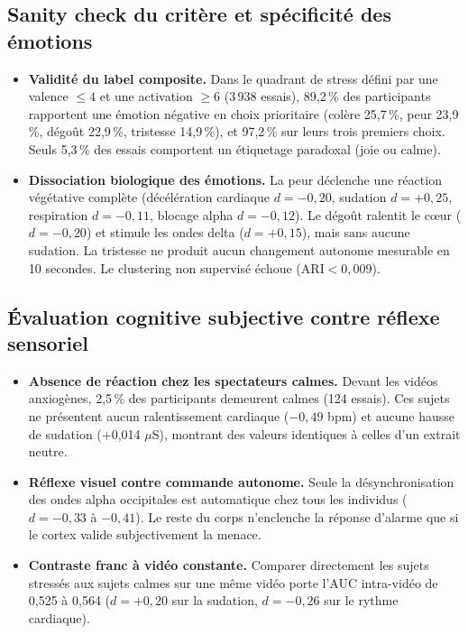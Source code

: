 \documentclass[10pt,a4paper]{article}
\begin{document}
\subsection{Sanity check du critère et spécificité des émotions}
\begin{itemize}
  \item \textbf{Validité du label composite.} Dans le quadrant de stress défini par une valence $\le 4$ et une activation $\ge 6$ (3\,938 essais), 89,2\,\% des participants rapportent une émotion négative en choix prioritaire (colère 25,7\,\%, peur 23,9\,\%, dégoût 22,9\,\%, tristesse 14,9\,\%), et 97,2\,\% sur leurs trois premiers choix. Seuls 5,3\,\% des essais comportent un étiquetage paradoxal (joie ou calme).
  \item \textbf{Dissociation biologique des émotions.} La peur déclenche une réaction végétative complète (décélération cardiaque $d = -0,20$, sudation $d = +0,25$, respiration $d = -0,11$, blocage alpha $d = -0,12$). Le dégoût ralentit le cœur ($d = -0,20$) et stimule les ondes delta ($d = +0,15$), mais sans aucune sudation. La tristesse ne produit aucun changement autonome mesurable en 10 secondes. Le clustering non supervisé échoue ($\mathrm{ARI} < 0,009$).
\end{itemize}

\subsection{Évaluation cognitive subjective contre réflexe sensoriel}
\begin{itemize}
  \item \textbf{Absence de réaction chez les spectateurs calmes.} Devant les vidéos anxiogènes, 2,5\,\% des participants demeurent calmes (124 essais). Ces sujets ne présentent aucun ralentissement cardiaque ($-0,49$ bpm) et aucune hausse de sudation (+0,014 $\mu$S), montrant des valeurs identiques à celles d'un extrait neutre.
  \item \textbf{Réflexe visuel contre commande autonome.} Seule la désynchronisation des ondes alpha occipitales est automatique chez tous les individus ($d = -0,33$ à $-0,41$). Le reste du corps n'enclenche la réponse d'alarme que si le cortex valide subjectivement la menace.
  \item \textbf{Contraste franc à vidéo constante.} Comparer directement les sujets stressés aux sujets calmes sur une même vidéo porte l'AUC intra-vidéo de 0,525 à 0,564 ($d = +0,20$ sur la sudation, $d = -0,26$ sur le rythme cardiaque).
\end{itemize}
\end{document}
